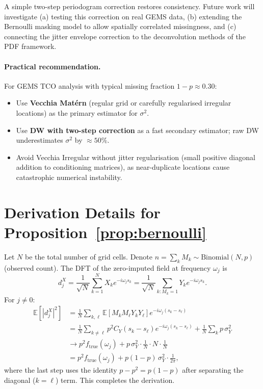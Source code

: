 \documentclass[12pt]{article}
\begin{document}
A simple two-step periodogram correction restores consistency.
Future work will investigate (a) testing this correction on real
GEMS data, (b) extending the Bernoulli masking model to allow spatially
correlated missingness, and (c) connecting the jitter envelope
correction to the deconvolution methods of the PDF framework.

\paragraph{Practical recommendation.}
For GEMS TCO analysis with typical missing fraction $1-p \approx 0.30$:
\begin{itemize}
  \item Use \textbf{Vecchia Matérn} (regular grid or carefully
        regularised irregular locations) as the primary estimator for
        $\sigma^2$.
  \item Use \textbf{DW with two-step correction} as a fast
        secondary estimator; raw DW underestimates $\sigma^2$ by
        $\approx 50\%$.
  \item Avoid Vecchia Irregular without jitter regularisation
        (small positive diagonal addition to conditioning matrices),
        as near-duplicate locations cause catastrophic numerical
        instability.
\end{itemize}


\appendix
\section{Derivation Details for Proposition~\ref{prop:bernoulli}}

Let $N$ be the total number of grid cells.
Denote $n = \sum_k M_k \sim \text{Binomial}(N, p)$ (observed count).
The DFT of the zero-imputed field at frequency $\omega_j$ is
\[
  d^X_j = \frac{1}{\sqrt{N}} \sum_{k=1}^N X_k e^{-i\omega_j s_k}
        = \frac{1}{\sqrt{N}} \sum_{k: M_k=1} Y_k e^{-i\omega_j s_k}.
\]
For $j \neq 0$:
\begin{align*}
  \mathbb{E}[|d^X_j|^2]
  &= \frac{1}{N}\sum_{k,\ell} \mathbb{E}[M_k M_\ell Y_k Y_\ell]
     e^{-i\omega_j(s_k - s_\ell)} \\
  &= \frac{1}{N}\sum_{k\neq\ell} p^2 C_Y(s_k - s_\ell)
     e^{-i\omega_j(s_k-s_\ell)}
   + \frac{1}{N}\sum_k p\,\sigma^2_Y \\
  &\to p^2 f_{\mathrm{true}}(\omega_j) + p\,\sigma^2_Y \cdot \frac{1}{N}
    \cdot N \cdot \frac{1}{N} \\
  &= p^2 f_{\mathrm{true}}(\omega_j) + p(1-p)\,\sigma^2_Y \cdot \frac{1}{2\pi},
\end{align*}
where the last step uses the identity
$p - p^2 = p(1-p)$ after separating the diagonal ($k=\ell$) term.
This completes the derivation.
\end{document}
